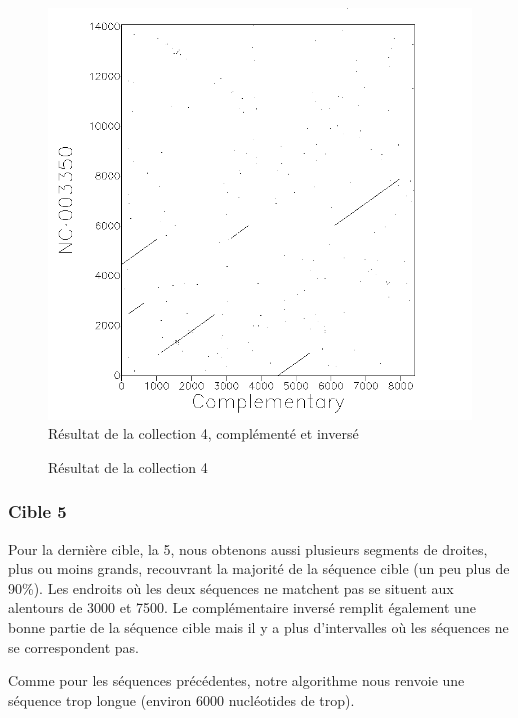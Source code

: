 \begin{figure}[!ht]
\begin{minipage}[c]{.46 \linewidth}
\begin{center}
			\includegraphics[scale= 0.4]{../res/cible4-ic.png}
			Résultat de la collection 4, complémenté et inversé
		\end{center}
	\end{minipage}
	\caption{Résultat de la collection 4}
\end{figure}

\FloatBarrier

\subsubsection*{Cible 5}

Pour la dernière cible, la 5, nous obtenons aussi plusieurs segments de droites,
plus ou moins grands, recouvrant la majorité de la séquence cible (un peu plus
de 90\%). Les endroits où les deux séquences ne matchent pas se situent aux
alentours de 3000 et 7500. Le complémentaire inversé remplit également une bonne
partie de la séquence cible mais il y a plus d'intervalles où les séquences ne
se correspondent pas.

Comme pour les séquences précédentes, notre algorithme nous renvoie une séquence
trop longue (environ 6000 nucléotides de trop).

